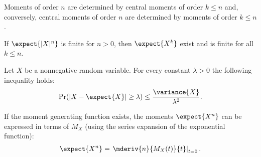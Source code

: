     \begin{remark}
        Moments of order $n$ are determined by central moments of order $k\leq n$ and, conversely, central moments of order $n$ are determined by moments of order $k\leq n$.
    \end{remark}

    \begin{property}
        If $\expect{|X|^n}$ is finite for $n>0$, then $\expect{X^k}$ exist and is finite for all $k\leq n$.
    \end{property}

    \begin{property}
        Let $X$ be a nonnegative random variable. For every constant $\lambda>0$ the following inequality holds:
        \begin{gather}
            \mathrm{Pr}(|X-\expect{X}|\geq\lambda)\leq\frac{\variance{X}}{\lambda^2}.
        \end{gather}
    \end{property}

    \begin{property}
        If the moment generating function exists, the moments $\expect{X^n}$ can be expressed in terms of $M_X$ (using the series expansion of the exponential function):
        \begin{gather}
            \label{prob:moment_generating}
            \expect{X^n} = \left.\mderiv{n}{M_X(t)}{t}\right|_{t=0}.
        \end{gather}
    \end{property}

